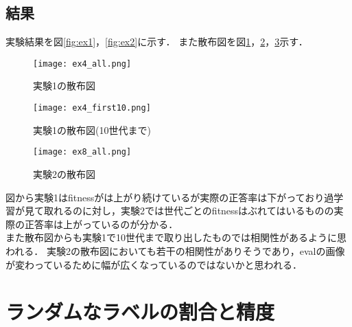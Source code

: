 \documentclass[twocolumn]{jarticle}     %
\begin{document}
\subsection{結果}
実験結果を図\ref{fig:ex1}，\ref{fig:ex2}に示す．
また散布図を図\ref{fig:ex1:1}，\ref{fig:ex1:2}，\ref{fig:ex2:1}示す．\\

\begin{figure}[h]
	\begin{center}
		\centering
		\texttt{[image: ex4\_all.png]}
		\caption{実験1の散布図\label{fig:ex1:1}}
	\end{center}
\end{figure}
\begin{figure}[h]
	\begin{center}
		\centering
		\texttt{[image: ex4\_first10.png]}
		\caption{実験1の散布図(10世代まで)\label{fig:ex1:2}}
	\end{center}
\end{figure}
\begin{figure}[bh]
	\begin{center}
		\centering
		\texttt{[image: ex8\_all.png]}
		\caption{実験2の散布図\label{fig:ex2:1}}
	\end{center}
\end{figure}
\clearpage

図から実験1はfitnessがは上がり続けているが実際の正答率は下がっており過学習が見て取れるのに対し，実験2では世代ごとのfitnessはぶれてはいるものの実際の正答率は上がっているのが分かる．\\
また散布図からも実験1で10世代まで取り出したものでは相関性があるように思われる．
実験2の散布図においても若干の相関性がありそうであり，evalの画像が変わっているために幅が広くなっているのではないかと思われる．

\section{ランダムなラベルの割合と精度}
\end{document}
